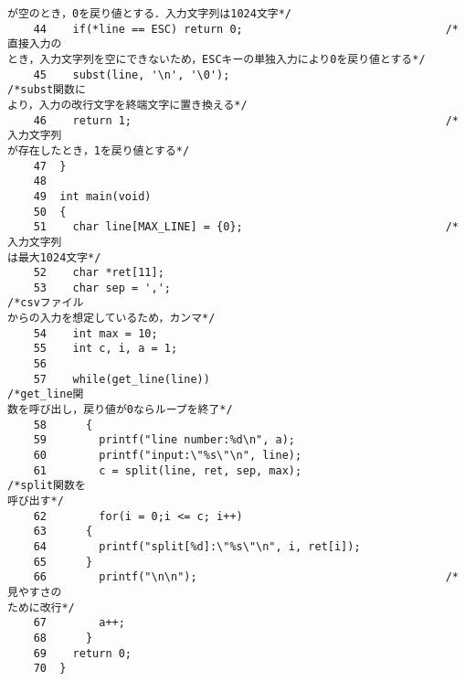 \begin{Verbatim}[fontsize=\small, baselinestretch=0.8]
が空のとき，0を戻り値とする．入力文字列は1024文字*/
    44	  if(*line == ESC) return 0;                               /*直接入力の
とき，入力文字列を空にできないため，ESCキーの単独入力により0を戻り値とする*/
    45	  subst(line, '\n', '\0');                                 /*subst関数に
より，入力の改行文字を終端文字に置き換える*/
    46	  return 1;                                                /*入力文字列
が存在したとき，1を戻り値とする*/
    47	}
    48	
    49	int main(void)
    50	{
    51	  char line[MAX_LINE] = {0};                               /*入力文字列
は最大1024文字*/
    52	  char *ret[11];
    53	  char sep = ',';                                          /*csvファイル
からの入力を想定しているため，カンマ*/
    54	  int max = 10;
    55	  int c, i, a = 1;
    56	  
    57	  while(get_line(line))                                    /*get_line関
数を呼び出し，戻り値が0ならループを終了*/
    58	    {
    59	      printf("line number:%d\n", a);
    60	      printf("input:\"%s\"\n", line);
    61	      c = split(line, ret, sep, max);                      /*split関数を
呼び出す*/
    62	      for(i = 0;i <= c; i++)
    63		{
    64		  printf("split[%d]:\"%s\"\n", i, ret[i]);
    65		}
    66	      printf("\n\n");                                      /*見やすさの
ために改行*/
    67	      a++;
    68	    }
    69	  return 0;
    70	}
\end{Verbatim}

